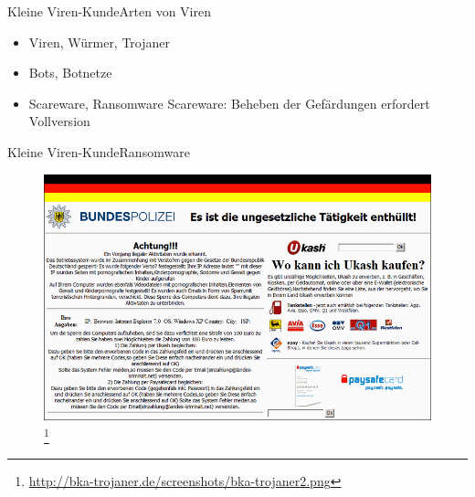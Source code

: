 \documentclass[10pt]{beamer}
\begin{document}
\begin{frame}{Kleine Viren-Kunde}{Arten von Viren}
\begin{itemize}
	\item Viren, Würmer, Trojaner
	\item Bots, Botnetze
	\item Scareware, Ransomware
	\note Scareware: Beheben der Gefärdungen erfordert Vollversion
\end{itemize}
\end{frame}







\begin{frame}{Kleine Viren-Kunde}{Ransomware}

	\begin{figure}[p]
		\centering
		\includegraphics[scale=0.25]{bka-trojaner.png}
		\let\thefootnote\relax\footnote{\url{http://bka-trojaner.de/screenshots/bka-trojaner2.png}}
	\end{figure}

\end{frame}
\end{document}
